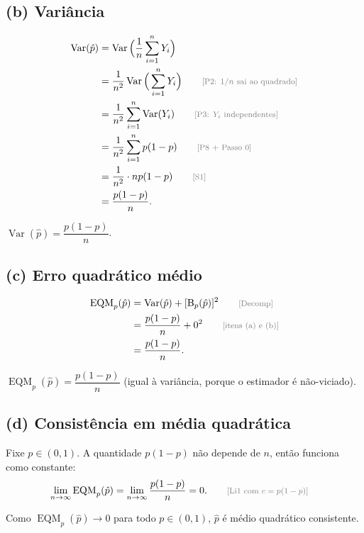 \documentclass[11pt,a4paper]{article}
\newcommand{\Var}{\operatorname{Var}}
\newcommand{\EQM}{\operatorname{EQM}}
\newcommand{\B}{\operatorname{B}}
\newcommand{\just}[1]{\tag*{\footnotesize\textcolor{gray}{[#1]}}}
\begin{document}
\subsection*{(b) Variância}
\begin{align*}
\Var(\hat p)&=\Var\Big(\frac1n\sum_{i=1}^nY_i\Big)\\
&=\frac1{n^2}\Var\Big(\sum_{i=1}^nY_i\Big) \just{P2: $1/n$ sai ao quadrado}\\
&=\frac1{n^2}\sum_{i=1}^n\Var(Y_i) \just{P3: $Y_i$ independentes}\\
&=\frac1{n^2}\sum_{i=1}^np(1-p) \just{P8 + Passo 0}\\
&=\frac1{n^2}\cdot np(1-p) \just{S1}\\
&=\frac{p(1-p)}{n}.
\end{align*}
\begin{resposta}
$\Var(\hat p)=\dfrac{p(1-p)}{n}$.
\end{resposta}

\subsection*{(c) Erro quadrático médio}
\begin{align*}
\EQM_p(\hat p)&=\Var(\hat p)+[\B_p(\hat p)]^2 \just{Decomp}\\
&=\frac{p(1-p)}{n}+0^2 \just{itens (a) e (b)}\\
&=\frac{p(1-p)}{n}.
\end{align*}
\begin{resposta}
$\EQM_p(\hat p)=\dfrac{p(1-p)}{n}$ (igual à variância, porque o estimador é não-viciado).
\end{resposta}

\subsection*{(d) Consistência em média quadrática}
Fixe $p\in(0,1)$. A quantidade $p(1-p)$ não depende de $n$, então funciona como constante:
\begin{align*}
\lim_{n\to\infty}\EQM_p(\hat p)&=\lim_{n\to\infty}\frac{p(1-p)}{n}=0 . \just{Li1 com $c=p(1-p)$}
\end{align*}
\begin{resposta}
Como $\EQM_p(\hat p)\to0$ para todo $p\in(0,1)$, $\hat p$ é médio quadrático consistente.
\end{resposta}
\end{document}
